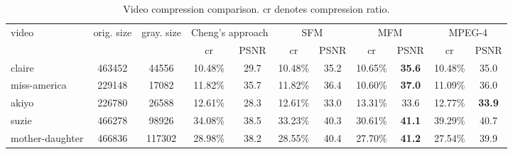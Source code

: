 \begin{table}[t]
  \centering \scriptsize
  \caption{Video compression comparison. cr denotes compression ratio.}
  \label{tab:more-example}
  \begin{tabular}{|l|c|c|c|c|c|c|c|c|c|c|}
    \hline
    video & orig. size & gray. size & \multicolumn{2}{|c|}{Cheng's approach} & \multicolumn{2}{|c|}{SFM} & \multicolumn{2}{|c|}{MFM} & \multicolumn{2}{|c|}{MPEG-4} \\
    \cline{4-11}
    & & & cr & PSNR & cr & PSNR & cr & PSNR & cr & PSNR \\
    \hline
    claire & 463452 & 44556 & 10.48\% & 29.7 & 10.48\% & 35.2 & 10.65\% & \textbf{35.6} & 10.48\% & 35.0 \\
    \hline
    miss-america & 229148 & 17082 & 11.82\% & 35.7 & 11.82\% & 36.4 & 10.60\% & \textbf{37.0} & 11.09\% & 36.0 \\
    \hline
    akiyo & 226780 & 26588 & 12.61\% & 28.3 & 12.61\% & 33.0 & 13.31\% & 33.6 & 12.77\% & \textbf{33.9} \\
    \hline
    suzie & 466278 & 98926 & 34.08\% & 38.5 & 33.23\% & 40.3 & 30.61\% & \textbf{41.1} & 39.29\% & 40.7 \\
    \hline
    mother-daughter & 466836 & 117302 & 28.98\% & 38.2 & 28.55\% & 40.4 & 27.70\% & \textbf{41.2} & 27.54\% & 39.9 \\
    \hline
  \end{tabular}
\end{table}

